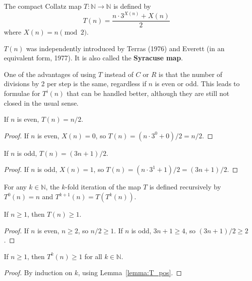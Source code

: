 \begin{definition}\label{def:T}\leanok
The compact Collatz map $T: \mathbb{N} \to \mathbb{N}$ is defined by
\begin{equation}
    T(n) = \frac{n \cdot 3^{X(n)} + X(n)}{2}
\end{equation}
where $X(n) = n \pmod 2$.
\end{definition}
$T(n)$ was independently introduced by Terras (1976)\cite{terras76} and Everett (in an
equivalent form, 1977)\cite{everett77}. It is also called the {\bf Syracuse map}.

One of the advantages of using $T$ instead of $C$ or $R$ is that the number of divisions by 2
per step is the same, regardless if $n$ is even or odd. This leads to formulae for $T^i(n)$
that can be handled better, although they are still not closed in the usual sense.

\begin{lemma}\label{lemma:T_even}\leanok
If $n$ is even, $T(n) = n/2$.
\end{lemma}
\begin{proof}\leanok
If $n$ is even, $X(n) = 0$, so $T(n) = (n \cdot 3^0 + 0) / 2 = n/2$.
\end{proof}

\begin{lemma}\label{lemma:T_odd}\leanok
If $n$ is odd, $T(n) = (3n + 1)/2$.
\end{lemma}
\begin{proof}\leanok
If $n$ is odd, $X(n) = 1$, so $T(n) = (n \cdot 3^1 + 1) / 2 = (3n + 1)/2$.
\end{proof}

\begin{definition}\label{def:T_iter}\leanok
For any $k \in \mathbb{N}$, the $k$-fold iteration of the map $T$ is defined recursively by $T^0(n) = n$ and $T^{k+1}(n) = T(T^k(n))$.
\end{definition}

\begin{lemma}\label{lemma:T_pos}\leanok
If $n \ge 1$, then $T(n) \ge 1$.
\end{lemma}
\begin{proof}\leanok
If $n$ is even, $n \ge 2$, so $n/2 \ge 1$. If $n$ is odd, $3n+1 \ge 4$, so $(3n+1)/2 \ge 2$.
\end{proof}

\begin{lemma}\label{lemma:T_iter_pos}\leanok
If $n \ge 1$, then $T^k(n) \ge 1$ for all $k \in \mathbb{N}$.
\end{lemma}
\begin{proof}\leanok
By induction on $k$, using Lemma~\ref{lemma:T_pos}.
\end{proof}

